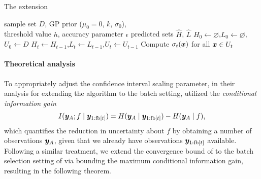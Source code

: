 \begin{algorithm}[tb]
  \caption{The \bacl extension}
  \label{alg:bacl}
\begin{algorithmic}[1]
  \REQUIRE sample set $D$, GP prior ($\mu_0 = 0$, $k$, $\sigma_0$),\\
           \hspace{1.6em}threshold value $h$, accuracy parameter $\epsilon$
  \ENSURE predicted sets $\hat{H}$, $\hat{L}$
  \STATE $H_0 \gets \varnothing$,\enskip $L_0 \gets \varnothing$,\enskip $U_0 \gets D$ \label{lin:binit1}
   \label{lin:binit2}
    \STATE $H_t \gets H_{t-1}$,\enskip $L_t \gets L_{t-1}$,\enskip $U_t \gets U_{t-1}$
       \label{lin:bupd}
       \label{lin:bclass1}
       \label{lin:bclassr2}
      \ENDIF \label{lin:bclass2}
    \ENDFOR
     \label{lin:sel1}
    \STATE Compute $\sigma_t(\bm{x})$ for all $\bm{x} \in U_t$
  \ENDWHILE
   \label{lin:bret1}
   \label{lin:bret2}
\end{algorithmic}
\end{algorithm}

\paragraph{Theoretical analysis}
To appropriately adjust the confidence interval scaling parameter,
in their analysis for extending the \gpucb algorithm to the batch
setting, \citet{desautels12} utilized the
\emph{conditional information gain}
\begin{align*}
I(\bm{y}_A; f \mid \bm{y}_{1:\mathop{\mathrm{fb}}[t]}) = H(\bm{y}_A\mid\bm{y}_{1:\mathop{\mathrm{fb}}[t]}) - H(\bm{y}_A\mid f),
\end{align*}
which quantifies the reduction in uncertainty about $f$ by obtaining
a number of observations $\bm{y}_A$, given that we already have observations
$\bm{y}_{1:\mathop{\mathrm{fb}}[t]}$ available.
Following a similar treatment, we extend the convergence bound of
 to the batch selection setting of
\bacl via bounding the maximum conditional information gain, resulting
in the following theorem.

